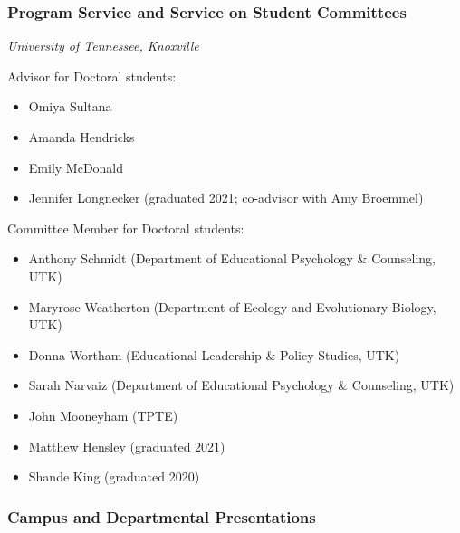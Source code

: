\documentclass[
  14,
]{article}
\providecommand{\tightlist}{%
  \setlength{\itemsep}{0pt}\setlength{\parskip}{0pt}}
\begin{document}
\hypertarget{program-service-and-service-on-student-committees}{%
\subsubsection{Program Service and Service on Student
Committees}\label{program-service-and-service-on-student-committees}}

\emph{University of Tennessee, Knoxville}

Advisor for Doctoral students:

\begin{itemize}
\tightlist
\item
  Omiya Sultana\\
\item
  Amanda Hendricks\\
\item
  Emily McDonald\\
\item
  Jennifer Longnecker (graduated 2021; co-advisor with Amy Broemmel)
\end{itemize}

Committee Member for Doctoral students:

\begin{itemize}
\tightlist
\item
  Anthony Schmidt (Department of Educational Psychology \& Counseling,
  UTK)\\
\item
  Maryrose Weatherton (Department of Ecology and Evolutionary Biology,
  UTK)\\
\item
  Donna Wortham (Educational Leadership \& Policy Studies, UTK)\\
\item
  Sarah Narvaiz (Department of Educational Psychology \& Counseling,
  UTK)\\
\item
  John Mooneyham (TPTE)\\
\item
  Matthew Hensley (graduated 2021)\\
\item
  Shande King (graduated 2020)
\end{itemize}

\hypertarget{campus-and-departmental-presentations}{%
\subsubsection{Campus and Departmental
Presentations}\label{campus-and-departmental-presentations}}
\end{document}
